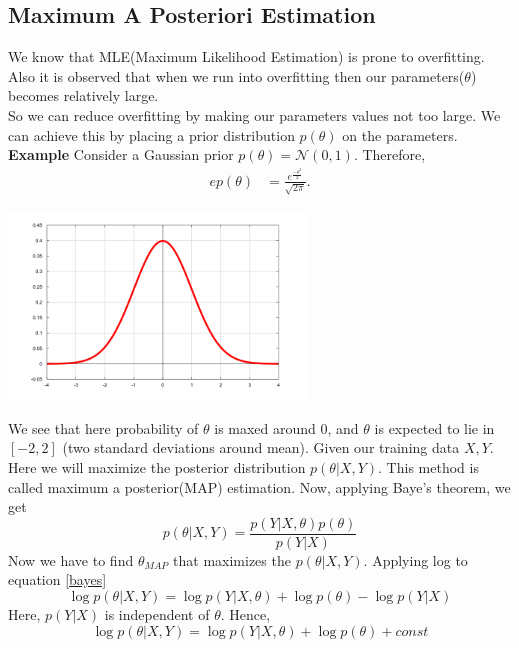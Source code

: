 \documentclass[12pt]{article}
\numberwithin{equation}{section}
\begin{document}
{\subsection{Maximum A Posteriori Estimation}
We know that MLE(Maximum Likelihood Estimation) is prone to overfitting.\\
Also it is observed that when we run into overfitting then our parameters($\theta$) becomes relatively large.\\
So we can reduce overfitting by making our parameters values not too large. We can achieve this by placing a prior distribution $p(\theta)$ on the parameters.\\
\textbf{Example} Consider a Gaussian prior $p(\theta) = \mathcal{N}(0, 1)$. Therefore,
\begin{align*}
e p(\theta) &= \frac{e^{\frac{-\theta^2}{2}}}{\sqrt{2\pi}}.
\end{align*}
\begin{center}
	\includegraphics[width=\columnwidth/2, height=5cm]{graph12}
\end{center}
We see that here probability of $\theta$ is maxed around $0$, and $\theta$ is expected to lie in $[-2, 2]$ (two standard deviations around mean). Given our training data $X, Y$. Here we will maximize the posterior distribution $p(\theta|X, Y)$. This method is called maximum a posterior(MAP) estimation. Now, applying Baye's theorem, we get
\begin{equation}
	p(\theta|X, Y) = \frac{p(Y|X, \theta)p(\theta)}{p(Y|X)} \label{bayes}
\end{equation}
Now we have to find $\theta_{MAP}$ that maximizes the $p(\theta|X, Y)$. Applying log to equation \eqref{bayes}
\begin{equation*}
	\log p(\theta|X, Y) = \log p(Y|X, \theta) + \log p(\theta) - \log p(Y|X)
\end{equation*}
Here, $p(Y|X)$ is independent of $\theta$. Hence, 
\begin{equation}
	\log p(\theta|X, Y) =  \log p(Y|X, \theta) + \log p(\theta) + const \label{map1}

\end{equation}}
\end{document}
